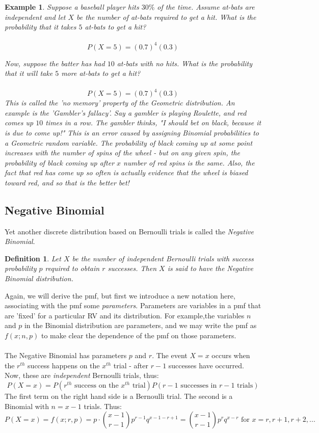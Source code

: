 \documentclass[12pt]{article} %
\newtheorem{defn}{Definition}
\newtheorem{example}{Example}
\begin{document}
\begin{example}
Suppose a baseball player hits $30\%$ of the time. Assume at-bats are independent and let $X$ be the number of at-bats required to get a hit. What is the probability that it takes $5$ at-bats to get a hit?\\\\
$$P(X=5)=(0.7)^4(0.3)$$

Now, suppose the batter has had $10$ at-bats with no hits. What is the probability that it will take $5$ more at-bats to get a hit?\\\\
$$P(X=5) = (0.7)^4(0.3)$$
This is called the 'no memory' property of the Geometric distribution. An example is the 'Gambler's fallacy'. Say a gambler is playing Roulette, and red comes up $10$ times in a row. The gambler thinks, "I should bet on black, because it is due to come up!" This is an error caused by assigning Binomial probabilities to a Geometric random variable. The probability of black coming up \emph{at some point} increases with the number of spins of the wheel - but on \emph{any given spin}, the probability of black coming up after $x$ number of red spins is the same. Also, the fact that red has come up so often is actually evidence that the wheel is biased toward red, and so that is the better bet!
\end{example}
\subsection{Negative Binomial}
Yet another discrete distribution based on Bernoulli trials is called the \emph{Negative Binomial}.
\begin{defn}
Let $X$ be the number of independent Bernoulli trials with success probability $p$ required to obtain $r$ successes. Then $X$ is said to have the \emph{Negative Binomial} distribution.
\end{defn}
Again, we will derive the pmf, but first we introduce a new notation here, associating with the pmf some \emph{parameters}. Parameters are variables in a pmf that are 'fixed' for a particular RV and its distribution. For example,the variables $n$ and $p$ in the Binomial distribution are  parameters, and we may write the pmf as $f(x;n,p)$ to make clear the dependence of the pmf on those parameters.\\\\
The Negative Binomial has parameters $p$ and $r$. The event $X=x$ occurs when the $r^{th}$ success happens on the $x^{th}$ trial - after $r-1$ successes have occurred. Now, these are \emph{independent} Bernoulli trials, thus:
$$P(X=x) = P(r^{th}\textrm{ success on the }x^{th} \textrm{ trial}) P(r-1\textrm{ successes in } r-1\textrm{ trials})$$
The first term on the right hand side is a Bernoulli trial. The second is a Binomial with $n=x-1$ trials. Thus:
$$P(X=x) = f(x;r,p) = p\cdot {{x-1}\choose{r-1}}p^{r-1}q^{x-1-r+1} = {{x-1}\choose{r-1}}p^rq^{x-r} \textrm{ for } x=r,r+1,r+2,...$$
\end{document}
